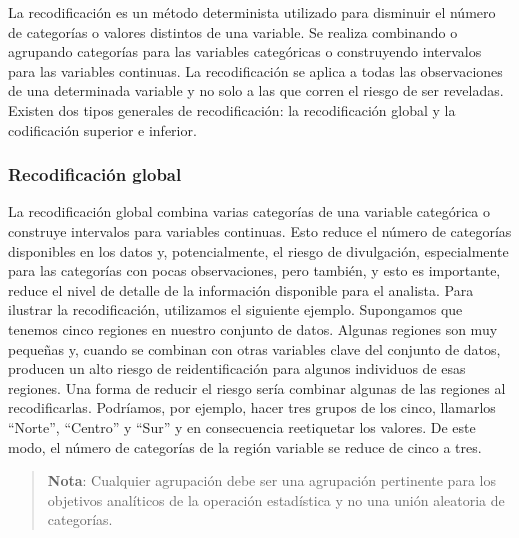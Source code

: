 \documentclass[]{book}
\theoremstyle{definition}
\theoremstyle{definition}
\theoremstyle{definition}
\theoremstyle{definition}
\theoremstyle{remark}
\begin{document}
La recodificación es un método determinista utilizado para disminuir el número de categorías o valores distintos de una variable. Se realiza combinando o agrupando categorías para las variables categóricas o construyendo intervalos para las variables continuas. La recodificación se aplica a todas las observaciones de una determinada variable y no solo a las que corren el riesgo de ser reveladas. Existen dos tipos generales de recodificación: la recodificación global y la codificación superior e inferior.

\hypertarget{recodificaciuxf3n-global}{%
\subsubsection{Recodificación global}\label{recodificaciuxf3n-global}}

La recodificación global combina varias categorías de una variable categórica o construye intervalos para variables continuas. Esto reduce el número de categorías disponibles en los datos y, potencialmente, el riesgo de divulgación, especialmente para las categorías con pocas observaciones, pero también, y esto es importante, reduce el nivel de detalle de la información disponible para el analista. Para ilustrar la recodificación, utilizamos el siguiente ejemplo. Supongamos que tenemos cinco regiones en nuestro conjunto de datos. Algunas regiones son muy pequeñas y, cuando se combinan con otras variables clave del conjunto de datos, producen un alto riesgo de reidentificación para algunos individuos de esas regiones. Una forma de reducir el riesgo sería combinar algunas de las regiones al recodificarlas. Podríamos, por ejemplo, hacer tres grupos de los cinco, llamarlos ``Norte'', ``Centro'' y ``Sur'' y en consecuencia reetiquetar los valores. De este modo, el número de categorías de la región variable se reduce de cinco a tres.

\begin{quote}
\textbf{Nota}: Cualquier agrupación debe ser una agrupación pertinente para los objetivos analíticos de la operación estadística y no una unión aleatoria de categorías.
\end{quote}
\end{document}
